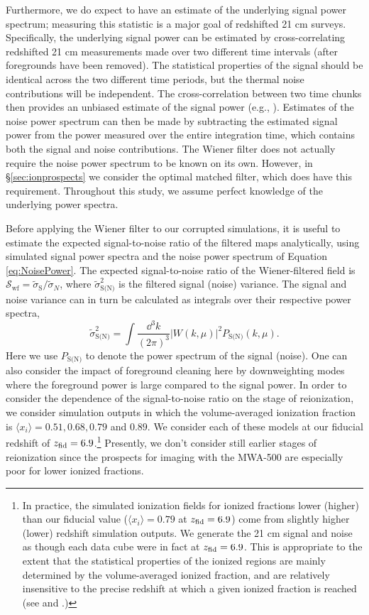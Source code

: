Furthermore, we do expect to have an estimate of the underlying signal power
spectrum; measuring this statistic is a major goal of redshifted 21 cm surveys. Specifically, the underlying
signal power can be estimated by cross-correlating
redshifted 21 cm measurements made over 
two different time intervals (after foregrounds have been removed). The statistical
properties of the signal should be identical across the two different time
periods, but the thermal noise contributions will be independent. The
cross-correlation between two time chunks then provides an unbiased
estimate of the signal power (e.g., \citealt{Liu:2009qga}). Estimates of the noise power spectrum can then be made by
subtracting the estimated signal power from the power measured over
the entire integration time, which contains both
the signal and noise contributions. The Wiener filter does not
actually require the noise power spectrum to be known on its
own. However, in  \S\ref{sec:ionprospects} we consider the optimal
matched filter, which does have this requirement. Throughout this study, we
assume perfect knowledge of the underlying power spectra.

Before applying the Wiener filter to our corrupted simulations, it is
useful to estimate the expected signal-to-noise ratio of the filtered maps 
analytically, using
simulated signal power spectra and the noise power
spectrum of Equation \ref{eq:NoisePower}. The expected signal-to-noise ratio of
the Wiener-filtered field is $\mathcal{S}_{\text{wf}} =
\tilde{\sigma}_{\text{S}}/\tilde{\sigma}_{N}$, where
$\tilde{\sigma}^{2}_{\text{S(N)}}$ is the filtered signal (noise)
variance. The signal and noise variance can in turn be calculated as
integrals over their respective power spectra,
\begin{equation}
\tilde{\sigma}^2_{\text{S(N)}} = \int \frac{\dd^3
  k}{(2\pi)^3}|W(k,\mu)|^{2}P_{\text{S(N)}}(k,\mu). \label{eq:snr}
\end{equation}
Here we use $P_{\text{S(N)}}$ to denote the power spectrum of the
signal (noise). One can also consider the impact of foreground
cleaning here by downweighting modes where the foreground power
is large compared to the signal power.
In order to consider the dependence of the signal-to-noise ratio
on the stage of reionization, we consider simulation outputs
in which the volume-averaged ionization fraction is 
$\langle x_i \rangle = 0.51, 0.68, 0.79$ and $0.89$. We consider each of these
models at our fiducial redshift of $z_{\rm fid} = 6.9$.\footnote{In practice,
the simulated ionization fields for ionized fractions lower (higher) than our fiducial value ($\langle x_i \rangle = 0.79$ at $z_{\rm fid} = 6.9$) 
come from slightly higher
(lower) redshift simulation outputs. We generate the 21 cm signal and noise as though each data cube were in
fact at $z_{\rm fid} = 6.9$. This is appropriate to the extent that
the statistical properties of the ionized regions are mainly determined by
the volume-averaged ionized fraction, and are relatively insensitive to the precise
redshift at which a given ionized fraction is reached (see \citealt{McQuinn:2006et}
and \citealt{Furlanetto:2004nh}.)} Presently, we don't consider still earlier stages
of reionization since the prospects for imaging with the MWA-500 are especially poor for lower
ionized fractions.

